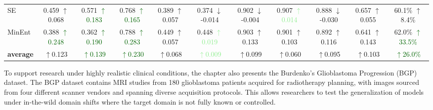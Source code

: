 \begin{table}[ht]
{\begin{tabular}{lcccccccccc}
			SE          & 0.459 \textcolor{medGreen}{$\uparrow$0.068} & 0.571 \textcolor{darkGreen}{$\uparrow$0.183} & 0.768 \textcolor{darkGreen}{$\uparrow$0.165} & 0.389 \textcolor{medGreen}{$\uparrow$0.057} & 0.374 \textcolor{lightRed}{$\downarrow$-0.014} & 0.902 \textcolor{lightRed}{$\downarrow$-0.004} & 0.907 \textcolor{lightGreen}{$\uparrow$0.014} & 0.888 \textcolor{lightRed}{$\downarrow$-0.030} & 0.657 \textcolor{medGreen}{$\uparrow$0.055} & 60.1\% \enspace \textcolor{medGreen}{$\uparrow$8.4\%} \\
			MinEnt      & 0.388 \textcolor{darkGreen}{$\uparrow$0.248} & 0.362 \textcolor{darkGreen}{$\uparrow$0.190} & 0.788 \textcolor{darkGreen}{$\uparrow$0.283} & 0.449 \textcolor{medGreen}{$\uparrow$0.057} & 0.448 \textcolor{lightGreen}{$\uparrow$0.019} & 0.903 \textcolor{medGreen}{$\uparrow$0.133} & 0.901 \textcolor{medGreen}{$\uparrow$0.103} & 0.892 \textcolor{medGreen}{$\uparrow$0.116} & 0.641 \textcolor{medGreen}{$\uparrow$0.143} & 62.0\% \textcolor{darkGreen}{$\uparrow$33.5\%} \\
			
			\midrule
			\textbf{average} &\textcolor{medGreen}{$\uparrow$0.123} & \textcolor{darkGreen}{$\uparrow$0.139} & \textcolor{darkGreen}{$\uparrow$0.230} & \textcolor{medGreen}{$\uparrow$0.068} & \textcolor{lightGreen}{$\uparrow$0.009} & \textcolor{medGreen}{$\uparrow$0.099} & \textcolor{medGreen}{$\uparrow$0.060} & \textcolor{medGreen}{$\uparrow$0.095} & \textcolor{medGreen}{$\uparrow$0.103} & \textcolor{darkGreen}{$\uparrow$26.0\%} \\  %
			
			\bottomrule
	\end{tabular}}
	\label{tab:ablation_aug}
\end{table}

To support research under highly realistic clinical conditions, the chapter also presents the Burdenko’s Glioblastoma Progression (BGP) dataset. The BGP dataset contains MRI studies from 180 glioblastoma patients acquired for radiotherapy planning, with images sourced from four different scanner vendors and spanning diverse acquisition protocols. This allows researchers to test the generalization of models under in-the-wild domain shifts where the target domain is not fully known or controlled.

